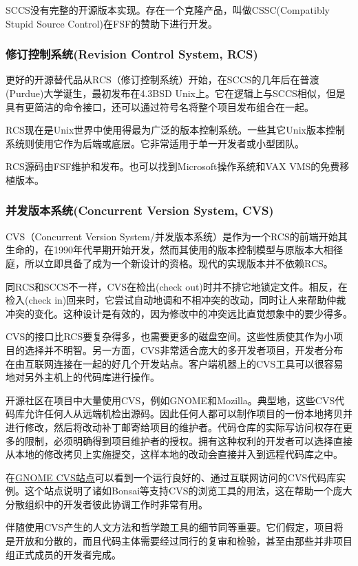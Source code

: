 \documentclass[12pt,oneside]{book}
\begin{document}
\begin{common-format}
SCCS没有完整的开源版本实现。存在一个克隆产品，叫做CSSC(Compatibly Stupid Source Control)在FSF的赞助下进行开发。

\subsubsection{修订控制系统(Revision Control System, RCS)}
更好的开源替代品从RCS（修订控制系统）开始，在SCCS的几年后在普渡(Purdue)大学诞生，最初发布在4.3BSD Unix上。它在逻辑上与SCCS相似，但是具有更简洁的命令接口，还可以通过符号名将整个项目发布组合在一起。

RCS现在是Unix世界中使用得最为广泛的版本控制系统。一些其它Unix版本控制系统则使用它作为后端或底层。它非常适用于单一开发者或小型团队。

RCS源码由FSF维护和发布。也可以找到Microsoft操作系统和VAX VMS的免费移植版本。

\subsubsection{并发版本系统(Concurrent Version System, CVS)}
CVS（Concurrent Version System/并发版本系统）是作为一个RCS的前端开始其生命的，在1990年代早期开始开发，然而其使用的版本控制模型与原版本大相径庭，所以立即具备了成为一个新设计的资格。现代的实现版本并不依赖RCS。

同RCS和SCCS不一样，CVS在检出(check out)时并不排它地锁定文件。相反，在检入(check in)回来时，它尝试自动地调和不相冲突的改动，同时让人来帮助仲裁冲突的变化。这种设计是有效的，因为修改中的冲突远比直觉想象中的要少得多。

CVS的接口比RCS要复杂得多，也需要更多的磁盘空间。这些性质使其作为小项目的选择并不明智。另一方面，CVS非常适合庞大的多开发者项目，开发者分布在由互联网连接在一起的好几个开发站点。客户端机器上的CVS工具可以很容易地对另外主机上的代码库进行操作。

开源社区在项目中大量使用CVS，例如GNOME和Mozilla。典型地，这些CVS代码库允许任何人从远端机检出源码。因此任何人都可以制作项目的一份本地拷贝并进行修改，然后将改动补丁邮寄给项目的维护者。代码仓库的实际写访问权存在更多的限制，必须明确得到项目维护者的授权。拥有这种权利的开发者可以选择直接从本地的修改拷贝上实施提交，这样本地的改动会直接并入到远程代码库之中。

在\href{http://cvs.gnome.org/}{GNOME CVS站点}可以看到一个运行良好的、通过互联网访问的CVS代码库实例。这个站点说明了诸如Bonsai等支持CVS的浏览工具的用法，这在帮助一个庞大分散组织中的开发者彼此协调工作时非常有用。

伴随使用CVS产生的人文方法和哲学踉工具的细节同等重要。它们假定，项目将是开放和分散的，而且代码主体需要经过同行的复审和检验，甚至由那些并非项目组正式成员的开发者完成。


\end{common-format}
\end{document}
